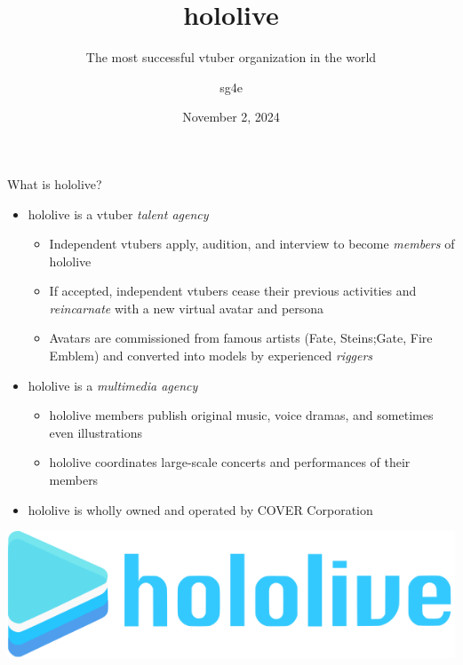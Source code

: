 \documentclass[aspectratio=169]{beamer}
\title{hololive}
\subtitle{The most successful vtuber organization in the world}
\author{sg4e}
\date{November 2, 2024}
\institute{sp0cktober 2024}
\begin{document}
\maketitle

\begin{frame}{What is hololive?}
    \begin{itemize}
        \item hololive is a vtuber \textit{talent agency}
        \begin{itemize}
            \item Independent vtubers apply, audition, and interview to become \textit{members} of hololive
            \item If accepted, independent vtubers cease their previous activities and \textit{reincarnate} with a new virtual avatar and persona
            \item Avatars are commissioned from famous artists (Fate, Steins;Gate, Fire Emblem) and converted into models by experienced \textit{riggers}
        \end{itemize}
        \item hololive is a \textit{multimedia agency}
        \begin{itemize}
            \item hololive members publish original music, voice dramas, and sometimes even illustrations
            \item hololive coordinates large-scale concerts and performances of their members
        \end{itemize}
        \item hololive is wholly owned and operated by COVER Corporation
    \end{itemize}
    \begin{center}
        \includegraphics[width=\linewidth,height=0.2\textheight,keepaspectratio]{images/hololive_logo.png}
    \end{center}
\end{frame}
\end{document}
